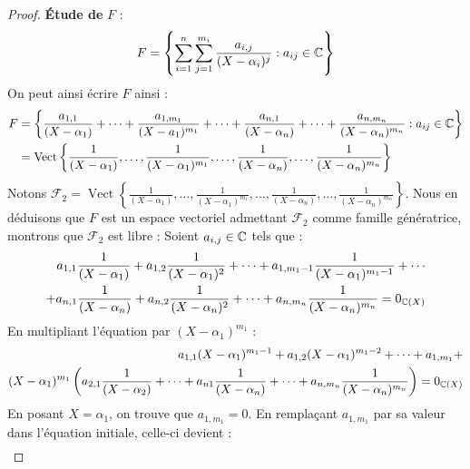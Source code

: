 \begin{proof}
    \textbf{\'Etude de} $F$ :
    \[ F = \left\{ \sum_{i = 1}^{n} \sum_{j = 1}^{m_i} \frac{a_{i, j}}{(X - \alpha_i)^{j}} : a_{ij} \in \mathbb{C} \right\} \]
    On peut ainsi écrire $F$ ainsi : 
    \begin{align*}
        F &= \left\{ \frac{a_{1, 1}}{(X - \alpha_1)} + \cdots + \frac{a_{1, m_1}}{(X - a_1)^{m_1}} + \cdots + \frac{a_{n, 1}}{(X - \alpha_n)} + \cdots + \frac{a_{n, m_n}}{(X - \alpha_n)^{m_n}} : a_{ij} \in \mathbb{C} \right\} \\
        &= \operatorname{Vect} \left\{ \frac{1}{(X - \alpha_1)}, \ldots, \frac{1}{(X - \alpha_1)^{m_1}}, \ldots, \frac{1}{(X - \alpha_n)}, \ldots, \frac{1}{(X - \alpha_n)^{m_n}}  \right\}
    \end{align*}
    Notons $\mathcal{F}_2 = \operatorname{Vect} \left\{ \frac{1}{(X - \alpha_1)}, \ldots, \frac{1}{(X - \alpha_1)^{m_1}}, \ldots, \frac{1}{(X - \alpha_n)}, \ldots, \frac{1}{(X - \alpha_n)^{m_n}}  \right\}$. Nous en déduisons que $F$ est un espace vectoriel admettant $\mathcal{F}_2$ comme famille génératrice, montrons que $\mathcal{F}_2$ est libre : Soient $a_{i,j} \in \mathbb{C}$ tels que :
    \begin{align*}
        \begin{split}
            a_{1,1} \frac{1}{(X - \alpha_1)} + a_{1,2} \frac{1}{(X - \alpha_1)^2} + \cdots + a_{1,m_1-1} \frac{1}{(X - \alpha_1)^{m_1 - 1}} + \cdots \\
            + a_{n,1} \frac{1}{(X - \alpha_n)} + a_{n,2} \frac{1}{(X - \alpha_n)^2} + \cdots + a_{n,m_n} \frac{1}{(X - \alpha_n)^{m_n}} = 0_{\mathbb{C}(X)}
        \end{split}
    \end{align*}
    En multipliant l'équation par $(X - \alpha_1)^{m_1}$ :
    \begin{align*}
        \begin{split}
            a_{1,1} (X - \alpha_1)^{m_1 - 1} + a_{1,2} (X - \alpha_1)^{m_1 - 2} + \cdots + a_{1,m_1} + \\
            (X - \alpha_1)^{m_1}
            \left( 
            a_{2,1} \frac{1}{(X - \alpha_2)} + \cdots + a_{n1} \frac{1}{(X - \alpha_n)} + \cdots + a_{n,m_n} \frac{1}{(X - \alpha_n)^{m_n}}
            \right)
            = 0_{\mathbb{C}(X)}
         \end{split}
    \end{align*}
    En posant $X = \alpha_1$, on trouve que $a_{1,m_1} = 0$.
    En remplaçant $a_{1,m_1}$ par sa valeur dans l'équation initiale, celle-ci devient : 
    \begin{align*}

\end{align*}
\end{proof}
